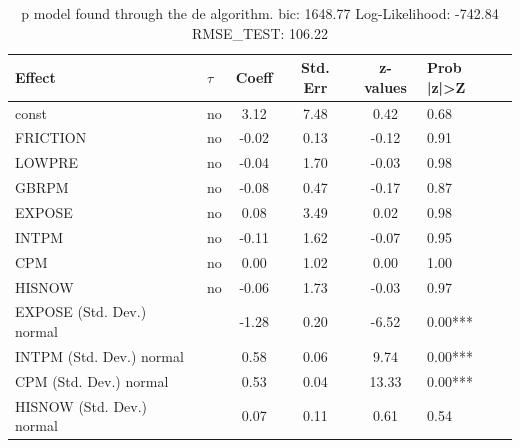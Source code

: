 \begin{table}
	\caption{p model found through the de algorithm. bic: 1648.77 Log-Likelihood: -742.84 RMSE_TEST: 106.22}
	\begin{center}
		\begin{tabular}{|l|l|c|c|c|l|}
			\hline
			Effect & $\tau$ & Coeff & Std. Err & z-values & Prob |z|>Z \\
			\hline
			const & no & 3.12 & 7.48 & 0.42 & 0.68 \\
			\hline
			FRICTION & no & -0.02 & 0.13 & -0.12 & 0.91 \\
			\hline
			LOWPRE & no & -0.04 & 1.70 & -0.03 & 0.98 \\
			\hline
			GBRPM & no & -0.08 & 0.47 & -0.17 & 0.87 \\
			\hline
			EXPOSE & no & 0.08 & 3.49 & 0.02 & 0.98 \\
			\hline
			INTPM & no & -0.11 & 1.62 & -0.07 & 0.95 \\
			\hline
			CPM & no & 0.00 & 1.02 & 0.00 & 1.00 \\
			\hline
			HISNOW & no & -0.06 & 1.73 & -0.03 & 0.97 \\
			\hline
			EXPOSE (Std. Dev.) normal &  & -1.28 & 0.20 & -6.52 & 0.00*** \\
			\hline
			INTPM (Std. Dev.) normal &  & 0.58 & 0.06 & 9.74 & 0.00*** \\
			\hline
			CPM (Std. Dev.) normal &  & 0.53 & 0.04 & 13.33 & 0.00*** \\
			\hline
			HISNOW (Std. Dev.) normal &  & 0.07 & 0.11 & 0.61 & 0.54 \\
			\hline
		\end{tabular}
	\end{center}
\end{table}